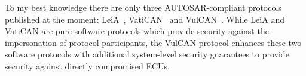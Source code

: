 To my best knowledge there are only three AUTOSAR-compliant protocols published at the moment: LeiA~\cite{Radu2016}, VatiCAN~\cite{Nurnberger2016} and VulCAN~\cite{VanBulck2017}. While LeiA and VatiCAN are pure software protocols which provide security against the impersonation of protocol participants, the VulCAN protocol enhances these two software protocols with additional system-level security guarantees to provide security against directly compromised ECUs.

